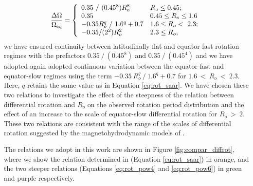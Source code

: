 \begin{equation}
\label{eq:rot_pow6}
{\centering
\frac{\Delta\Omega}{\Omega_{\rm{eq}}} = \left\{
\begin{array}{ll}
 0.35 \ / \ (0.45^8) R_o^8& R_o\leq 0.45; \\
 0.35 & 0.45\leq R_o\leq 1.6 \\
 -0.35 R_o^q \ / \ 1.6^q + 0.7 & 1.6 \leq R_o < \ 2.3;\\
 -0.35/(2^2) R_o^2 & 2.3\leq R_o, \\
\end{array} 
\right.}
\end{equation}
we have ensured continuity between latitudinally-flat and equator-fast rotation regimes with the prefactors $0.35 \ / \ (0.45^8)$ and $0.35 \ / \ (0.45^4)$ and we have adopted again adopted continuous variation between the equator-fast and equator-slow regimes using the term $-0.35 \ R_o^q \ / \ 1.6^q + 0.7$ for $1.6 \ < \ R_o \ < \ 2.3$.
Here, $q$ retains the same value as in Equation \ref{eq:rot_saar}.
We have chosen these two relations to investigate the effect of the steepness of the relation between differential rotation and $R_o$ on the observed rotation period distribution and the effect of an increase to the scale of equator-slow differential rotation for $R_o \ > \ 2$.
These two relations are consistent with the range of the scales of differential rotation suggested by the magnetohydrodynamic models of \citet{brun_powering_2022}.

The relations we adopt in this work are shown in Figure \ref{fig:compar_diffrot}, where we show the relation determined in \citet{saar_starspots_2011} (Equation \ref{eq:rot_saar}) in orange, and the two steeper relations (Equations \ref{eq:rot_pow4} and \ref{eq:rot_pow6}) in green and purple respectively.

